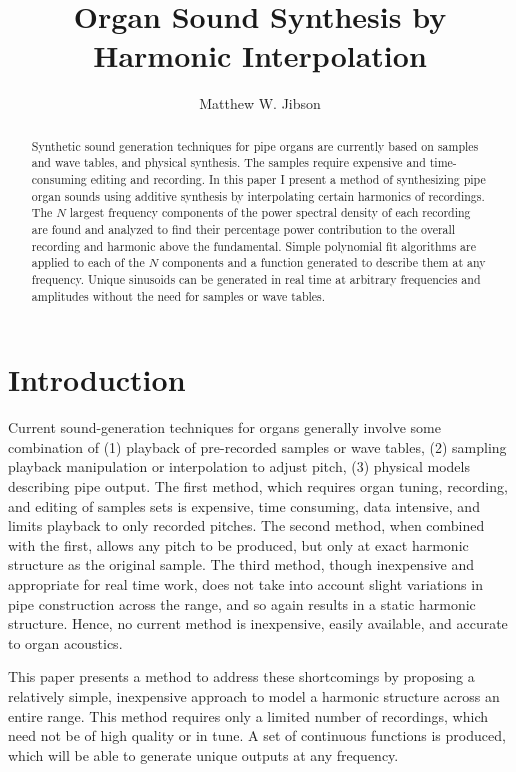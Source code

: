 \documentclass[twocolumn]{article}
\begin{document}
\title{Organ Sound Synthesis by Harmonic Interpolation}
\author{Matthew W. Jibson}

\maketitle{}

\begin{abstract}

Synthetic sound generation techniques for pipe organs are currently based on samples and wave tables, and physical synthesis. The samples require expensive and time-consuming editing and recording. In this paper I present a method of synthesizing pipe organ sounds using additive synthesis by interpolating certain harmonics of recordings. The $N$ largest frequency components of the power spectral density of each recording are found and analyzed to find their percentage power contribution to the overall recording and harmonic above the fundamental. Simple polynomial fit algorithms are applied to each of the $N$ components and a function generated to describe them at any frequency. Unique sinusoids can be generated in real time at arbitrary frequencies and amplitudes without the need for samples or wave tables.

\end{abstract}

\section{Introduction}

Current sound-generation techniques for organs generally involve some combination of (1) playback of pre-recorded samples or wave tables, (2) sampling playback manipulation or interpolation to adjust pitch, (3) physical models describing pipe output. The first method, which requires organ tuning, recording, and editing of samples sets is expensive, time consuming, data intensive, and limits playback to only recorded pitches. The second method, when combined with the first, allows any pitch to be produced, but only at exact harmonic structure as the original sample. The third method, though inexpensive and appropriate for real time work, does not take into account slight variations in pipe construction across the range, and so again results in a static harmonic structure. Hence, no current method is inexpensive, easily available, and accurate to organ acoustics.

This paper presents a method to address these shortcomings by proposing a relatively simple, inexpensive approach to model a harmonic structure across an entire range. This method requires only a limited number of recordings, which need not be of high quality or in tune. A set of continuous functions is produced, which will be able to generate unique outputs at any frequency.
\end{document}
